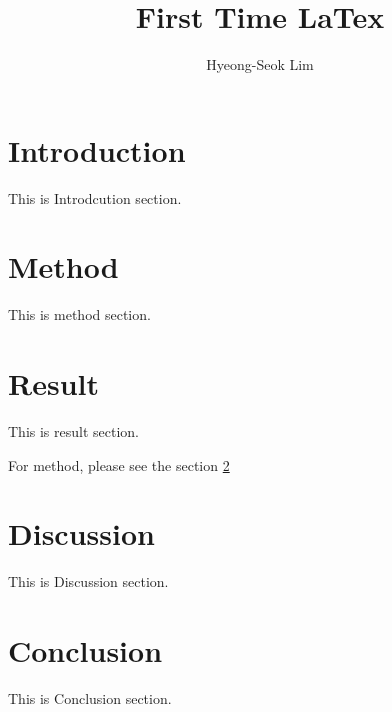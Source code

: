 \documentclass[titlepage]{article}
\title{First Time LaTex}
\author{Hyeong-Seok Lim}
\begin{document}
\maketitle
\tableofcontents

\section{Introduction}

This is Introdcution section.

\section{Method}
\label{sec:method}

This is method section.

\section{Result}

This is result section.

For method, please see the section \ref{sec:method}


\section{Discussion}

This is Discussion section.

\section{Conclusion}

This is Conclusion section.
\end{document}
